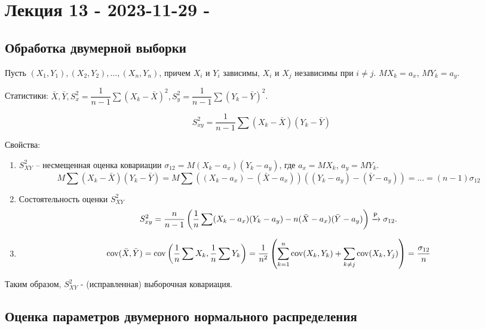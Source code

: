 \section{Лекция 13 - 2023-11-29 - }

\subsection{Обработка двумерной выборки}

Пусть $(X_1, Y_1), (X_2, Y_2), \dots, (X_n, Y_n)$, причем $X_i$ и $Y_i$ зависимы, $X_i$ и $X_j$ независимы при $i \neq j$.
$M X_k = a_x$, $M Y_k = a_y$.

Статистики: $\bar X, \bar Y, S_x^2 = \dfrac{1}{n-1} \sum (X_k - \bar X)^2, S_y^2 = \dfrac{1}{n-1} \sum (Y_k - \bar Y)^2$. 

\[
  S_{xy}^2 = \dfrac{1}{n-1} \sum (X_k - \bar X) (Y_k - \bar Y)
\]

Свойства:
\begin{enumerate}
  \item $S_{XY}^2$ -- несмещенная оценка ковариации $\sigma_{12} = M(X_k - a_x)(Y_k - a_y)$,
    где $a_x = MX_k$, $a_y = MY_k$.
    \[
      M \sum (X_k - \bar X)(Y_k - \bar Y)
      = M \sum \left( (X_k - a_x) - (\bar X - a_x)\right)
        \left( (Y_k-a_y) - (\bar Y - a_y) \right)
      = \dots
      = (n-1) \sigma_{12}
    \]

  \item Состоятельность оценки $S_{XY}^2$
    \begin{equation*}
      S_{xy}^2 = \dfrac{n}{n-1} \left( \dfrac{1}{n} \sum (X_k - a_x)(Y_k - a_y) - n (\bar X - a_x)(\bar Y - a_y) \right)
      \xrightarrow[]{\mathsf P}
      \sigma_{12}.
    \end{equation*}
    
  \item
    \begin{equation*}
      \operatorname{cov} (\bar X, \bar Y) = \operatorname{cov} \left( \dfrac{1}{n} \sum X_k, \dfrac{1}{n} \sum Y_k \right)
      = \dfrac{1}{n^2} \left( \sum_{k=1}^n \operatorname{cov} (X_k, Y_k) + \sum_{k\neq j} \operatorname{cov}(X_k, Y_j) \right)
      = \dfrac{\sigma_{12}}{n}
    \end{equation*}
\end{enumerate}

Таким образом, $S_{XY}^2$ - (исправленная) выборочная ковариация.


\subsection{Оценка параметров двумерного нормального распределения}

